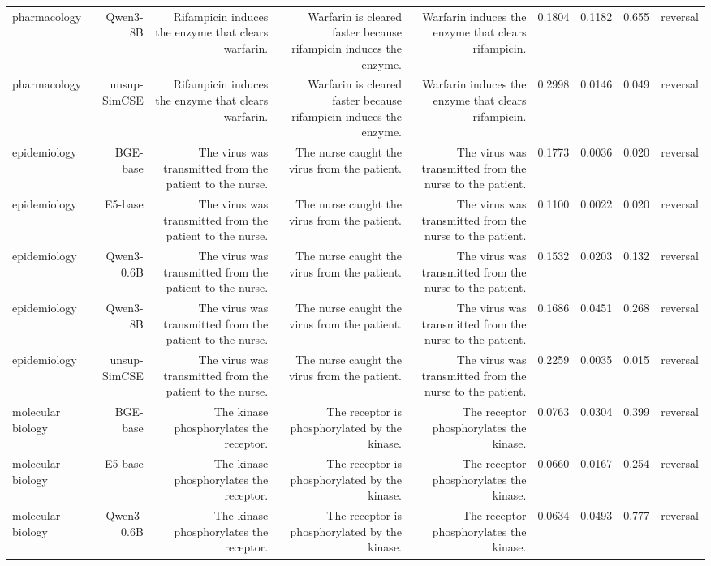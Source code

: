 \begin{table}[t]
\begin{tabular}{lrrrrrrrr}
pharmacology & Qwen3-8B & Rifampicin induces the enzyme that clears warfarin. & Warfarin is cleared faster because rifampicin induces the enzyme. & Warfarin induces the enzyme that clears rifampicin. & 0.1804 & 0.1182 & 0.655 & reversal \\
pharmacology & unsup-SimCSE & Rifampicin induces the enzyme that clears warfarin. & Warfarin is cleared faster because rifampicin induces the enzyme. & Warfarin induces the enzyme that clears rifampicin. & 0.2998 & 0.0146 & 0.049 & reversal \\
epidemiology & BGE-base & The virus was transmitted from the patient to the nurse. & The nurse caught the virus from the patient. & The virus was transmitted from the nurse to the patient. & 0.1773 & 0.0036 & 0.020 & reversal \\
epidemiology & E5-base & The virus was transmitted from the patient to the nurse. & The nurse caught the virus from the patient. & The virus was transmitted from the nurse to the patient. & 0.1100 & 0.0022 & 0.020 & reversal \\
epidemiology & Qwen3-0.6B & The virus was transmitted from the patient to the nurse. & The nurse caught the virus from the patient. & The virus was transmitted from the nurse to the patient. & 0.1532 & 0.0203 & 0.132 & reversal \\
epidemiology & Qwen3-8B & The virus was transmitted from the patient to the nurse. & The nurse caught the virus from the patient. & The virus was transmitted from the nurse to the patient. & 0.1686 & 0.0451 & 0.268 & reversal \\
epidemiology & unsup-SimCSE & The virus was transmitted from the patient to the nurse. & The nurse caught the virus from the patient. & The virus was transmitted from the nurse to the patient. & 0.2259 & 0.0035 & 0.015 & reversal \\
molecular biology & BGE-base & The kinase phosphorylates the receptor. & The receptor is phosphorylated by the kinase. & The receptor phosphorylates the kinase. & 0.0763 & 0.0304 & 0.399 & reversal \\
molecular biology & E5-base & The kinase phosphorylates the receptor. & The receptor is phosphorylated by the kinase. & The receptor phosphorylates the kinase. & 0.0660 & 0.0167 & 0.254 & reversal \\
molecular biology & Qwen3-0.6B & The kinase phosphorylates the receptor. & The receptor is phosphorylated by the kinase. & The receptor phosphorylates the kinase. & 0.0634 & 0.0493 & 0.777 & reversal \\

\end{tabular}
\end{table}
